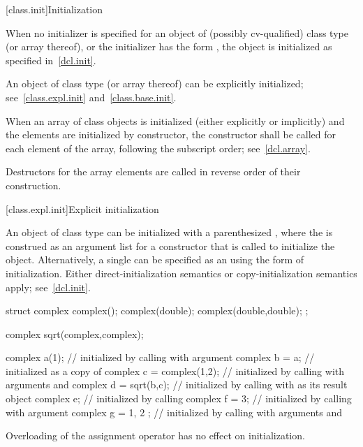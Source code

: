 [class.init]{Initialization}%
%
%

\pnum
When no initializer is specified for an object of (possibly
cv-qualified) class type (or array thereof), or the initializer has
the form
\tcode{()},
the object is initialized as specified in~\ref{dcl.init}.

\pnum
An object of class type (or array thereof) can be explicitly initialized;
see~\ref{class.expl.init} and~\ref{class.base.init}.

\pnum
{}%
When an array of class objects is initialized
(either explicitly or implicitly) and the elements are initialized by constructor,
the constructor shall be called for each element of the array,
following the subscript order; see~\ref{dcl.array}.
\begin{note}
Destructors for the array elements are called in reverse order of their
construction.
\end{note}

[class.expl.init]{Explicit initialization}%
%
%

\pnum
An object of class type can be initialized with a parenthesized
,
where the
is construed as an argument list for a constructor
that is called to initialize the object.
Alternatively, a single
can be specified as an
using the
\tcode{=}
form of initialization.
Either direct-initialization semantics or copy-initialization semantics apply;
see~\ref{dcl.init}.
\begin{example}
\begin{codeblock}
struct complex {
  complex();
  complex(double);
  complex(double,double);
};

complex sqrt(complex,complex);

complex a(1);                   // initialized by calling  with argument 
complex b = a;                  // initialized as a copy of 
complex c = complex(1,2);       // initialized by calling  with arguments  and 
complex d = sqrt(b,c);          // initialized by calling  with  as its result object
complex e;                      // initialized by calling 
complex f = 3;                  // initialized by calling  with argument 
complex g = { 1, 2 };           // initialized by calling  with arguments  and 
\end{codeblock}
\end{example}
\begin{note}
%
Overloading of the assignment operator
has no effect on initialization.
\end{note}

